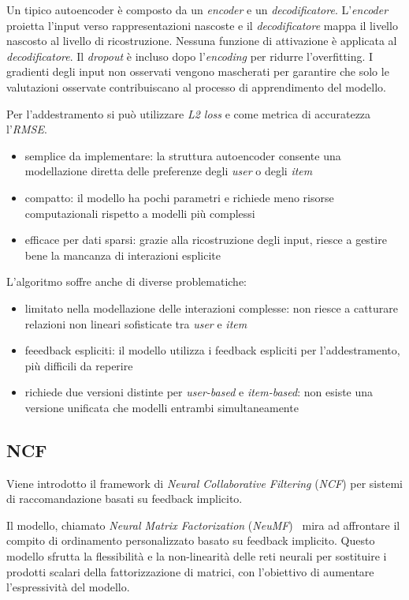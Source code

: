 Un tipico autoencoder è composto da un \textit{encoder} e un \textit{decodificatore}. L'\textit{encoder} proietta l'input verso rappresentazioni nascoste e il \textit{decodificatore} mappa il livello nascosto al livello di ricostruzione. Nessuna funzione di attivazione è applicata al \textit{decodificatore}. Il \textit{dropout} è incluso dopo l'\textit{encoding} per ridurre l'overfitting. I gradienti degli input non osservati vengono mascherati per garantire che solo le valutazioni osservate contribuiscano al processo di apprendimento del modello.

Per l'addestramento si può utilizzare \textit{L2 loss} e come metrica di accuratezza l'\textit{RMSE}.

\begin{itemize}
  \item semplice da implementare: la struttura autoencoder consente una modellazione diretta delle preferenze degli \textit{user} o degli \textit{item}
  \item compatto: il modello ha pochi parametri e richiede meno risorse computazionali rispetto a modelli più complessi
  \item efficace per dati sparsi: grazie alla ricostruzione degli input, riesce a gestire bene la mancanza di interazioni esplicite
\end{itemize}

L'algoritmo soffre anche di diverse problematiche:

\begin{itemize}
  \item limitato nella modellazione delle interazioni complesse: non riesce a catturare relazioni non lineari sofisticate tra \textit{user} e \textit{item}
  \item feeedback espliciti: il modello utilizza i feedback espliciti per l'addestramento, più difficili da reperire
  \item richiede due versioni distinte per \textit{user-based} e \textit{item-based}: non esiste una versione unificata che modelli entrambi simultaneamente
\end{itemize}

\subsection{NCF}\label{ncf}
Viene introdotto il framework di \textit{Neural Collaborative Filtering} (\textit{NCF}) per sistemi di raccomandazione basati su feedback implicito.

Il modello, chiamato \textit{Neural Matrix Factorization} (\textit{NeuMF})~\cite{NeuMF} mira ad affrontare il compito di ordinamento personalizzato basato su feedback implicito. Questo modello sfrutta la flessibilità e la non-linearità delle reti neurali per sostituire i prodotti scalari della fattorizzazione di matrici, con l'obiettivo di aumentare l'espressività del modello.

